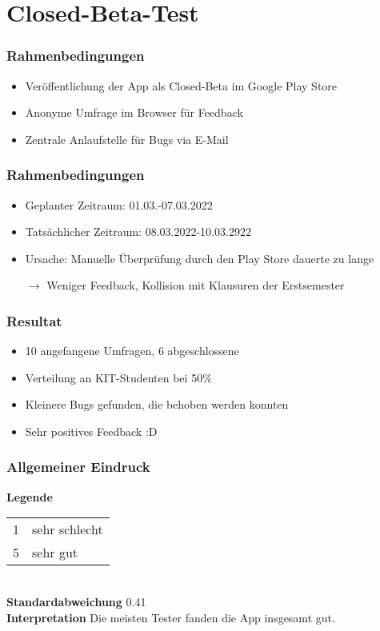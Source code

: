 \section{Closed-Beta-Test}

\begin{frame}\frametitle{Rahmenbedingungen}
    \begin{itemize}
        \item Veröffentlichung der App als Closed-Beta im Google Play Store
        \item Anonyme Umfrage im Browser für Feedback
        \item Zentrale Anlaufstelle für Bugs via E-Mail
    \end{itemize}
\end{frame}

\begin{frame}\frametitle{Rahmenbedingungen}
    \begin{itemize}
        \item Geplanter Zeitraum: 01.03.-07.03.2022
        \item Tatsächlicher Zeitraum: 08.03.2022-10.03.2922
        \item Ursache: Manuelle Überprüfung durch den Play Store dauerte zu lange
        \item[$\rightarrow$] Weniger Feedback, Kollision mit Klausuren der Erstsemester
    \end{itemize}
\end{frame}

\begin{frame}\frametitle{Resultat}
    \begin{itemize}
        \item 10 angefangene Umfragen, 6 abgeschlossene
        \item Verteilung an KIT-Studenten bei 50\%
        \item Kleinere Bugs gefunden, die behoben werden konnten
        \item Sehr positives Feedback :D
    \end{itemize}
\end{frame}

\begin{frame}\frametitle{Allgemeiner Eindruck}
    \begin{minipage}{\textwidth}
        \begin{minipage}{.49\textwidth}
        \end{minipage}
        \begin{minipage}{.49\textwidth}
            \textbf{Legende} 
            \begin{tabular}{l l}
                1 & sehr schlecht \\
                5 & sehr gut
            \end{tabular}\\
            \textbf{Standardabweichung}
            0.41\\
            \textbf{Interpretation}
            Die meisten Tester fanden die App insgesamt gut.
        \end{minipage}
    \end{minipage}
\end{frame}

